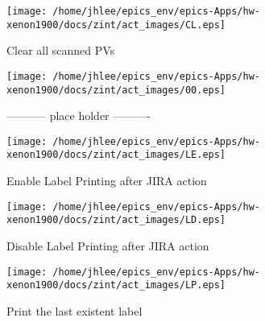 \noindent
\vspace{1.4cm}
\begin{minipage}{.2\textwidth}
\begin{center}
\texttt{[image: /home/jhlee/epics\_env/epics-Apps/hw-xenon1900/docs/zint/act\_images/CL.eps]}
\end{center}
\end{minipage}
\begin{minipage}{.7\textwidth}
Clear all scanned PVs
\end{minipage}


\noindent
\vspace{1.4cm}
\begin{minipage}{.2\textwidth}
\begin{center}
\texttt{[image: /home/jhlee/epics\_env/epics-Apps/hw-xenon1900/docs/zint/act\_images/00.eps]}
\end{center}
\end{minipage}
\begin{minipage}{.7\textwidth}
----------- place holder ----------
\end{minipage}


\noindent
\vspace{1.4cm}
\begin{minipage}{.2\textwidth}
\begin{center}
\texttt{[image: /home/jhlee/epics\_env/epics-Apps/hw-xenon1900/docs/zint/act\_images/LE.eps]}
\end{center}
\end{minipage}
\begin{minipage}{.7\textwidth}
Enable Label Printing after JIRA action
\end{minipage}


\noindent
\vspace{1.4cm}
\begin{minipage}{.2\textwidth}
\begin{center}
\texttt{[image: /home/jhlee/epics\_env/epics-Apps/hw-xenon1900/docs/zint/act\_images/LD.eps]}
\end{center}
\end{minipage}
\begin{minipage}{.7\textwidth}
Disable Label Printing after JIRA action
\end{minipage}


\noindent
\vspace{1.4cm}
\begin{minipage}{.2\textwidth}
\begin{center}
\texttt{[image: /home/jhlee/epics\_env/epics-Apps/hw-xenon1900/docs/zint/act\_images/LP.eps]}
\end{center}
\end{minipage}
\begin{minipage}{.7\textwidth}
Print the last existent label
\end{minipage}


